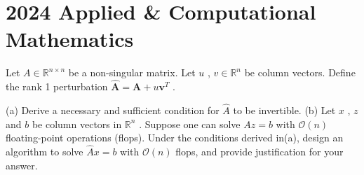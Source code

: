 \section{2024 Applied \& Computational Mathematics}

\begin{exercise}
\label{applied:2024:1}
Let $A \in \mathbb { R } ^ { n \times n }$ be a non-singular matrix. Let $u$ , $v \in \mathbb { R } ^ { n }$ be column vectors. Define the rank 1 perturbation $\widehat { \boldsymbol { A } } = \boldsymbol { A } + u \boldsymbol { v } ^ { T }$ .

(a) Derive a necessary and sufficient condition for $\widehat { A }$ to be invertible.   
(b) Let $x$ , $z$ and $b$ be column vectors in $\mathbb { R } ^ { n }$ . Suppose one can solve $A z = b$ with ${ \mathcal { O } } ( n )$ floating-point operations (flops). Under the conditions derived in(a), design an algorithm to solve ${ \widehat { A } } x = b$ with ${ \mathcal { O } } ( n )$ flops, and provide justification for your answer.
\end{exercise}

